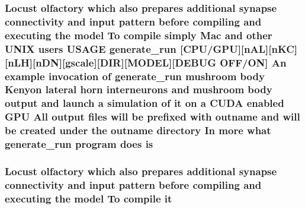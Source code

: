 \hypertarget{userproject_2MBody1__project_2README_8txt_aac3f20bc10af7f579c0fa075cf788fcc}{
\subsubsection[{is}]{\setlength{\rightskip}{0pt plus 5cm}Locust olfactory which also prepares additional synapse connectivity and input pattern before compiling and executing the {\bf model} To compile simply Mac and other U\+N\+I\+X users U\+S\+A\+G\+E {\bf generate\+\_\+run} \mbox{[}{\bf C\+P\+U}/{\bf G\+P\+U}\mbox{]}\mbox{[}n\+A\+L\mbox{]}\mbox{[}n\+K\+C\mbox{]}\mbox{[}n\+L\+H\mbox{]}\mbox{[}n\+D\+N\mbox{]}\mbox{[}gscale\mbox{]}\mbox{[}D\+I\+R\mbox{]}\mbox{[}M\+O\+D\+E\+L\mbox{]}\mbox{[}D\+E\+B\+U\+G O\+F\+F/O\+N\mbox{]} An example invocation of {\bf generate\+\_\+run} mushroom body Kenyon lateral horn {\bf interneurons} and mushroom body output and launch a simulation of {\bf it} on a C\+U\+D\+A enabled {\bf G\+P\+U} All output files will be prefixed {\bf with} outname and will be created under the outname {\bf directory} In more what {\bf generate\+\_\+run} program does is}}\label{userproject_2MBody1__project_2README_8txt_aac3f20bc10af7f579c0fa075cf788fcc}
\hypertarget{userproject_2MBody1__project_2README_8txt_a0f5e77768a9d48a2402aa5fa820e7f32}{
\subsubsection[{it}]{\setlength{\rightskip}{0pt plus 5cm}Locust olfactory which also prepares additional synapse connectivity and input pattern before compiling and executing the {\bf model} To compile it}}\label{userproject_2MBody1__project_2README_8txt_a0f5e77768a9d48a2402aa5fa820e7f32}
